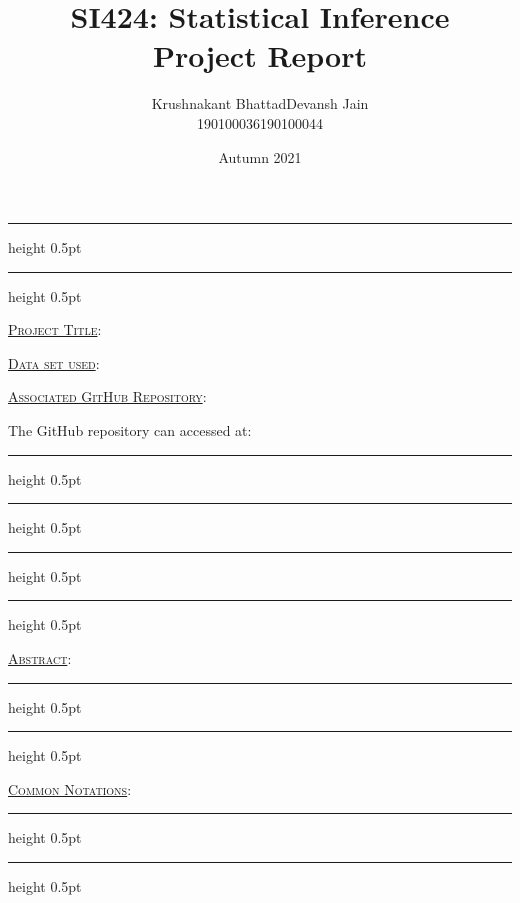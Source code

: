\documentclass[fleqn, 11pt]{article}
\title{SI424: Statistical Inference \\ Project Report}
\author{
\begin{tabular}{|c|c|}
     \hline
     \textsf{Krushnakant Bhattad} & \textsf{ \hspace{5pt} Devansh Jain \hspace{5pt} } \\
     \hline
     \textsf{190100036} & \textsf{190100044}\\
     \hline
\end{tabular}
}
\date{Autumn 2021}
\newcommand{\myline}{
  \par
  \kern3pt %
  \hrule height 0.5pt
  \kern2pt %
  \hrule height 0.5pt
  \kern3pt %
  \par
}
\renewcommand{\arraystretch}{2}%
\begin{document}
\maketitle
\thispagestyle{empty}
\renewcommand{\arraystretch}{1}%

\myline

\vspace{7pt}

\underline{\large {\textsc{Project Title}}}:

\medskip


\hrulefill

\vspace{10pt}

\underline{\large {\textsc{Data set used}}}:

\medskip


\hrulefill

\vspace{10pt}

\underline{\large {\textsc{Associated GitHub Repository}}}:

\medskip

The GitHub repository can accessed at:

\vspace{7pt}

\myline

\newpage

\setcounter{page}{1}

\vspace{-2em}
\myline

\vspace{10pt}

\underline{\large {\textsc{Abstract}}}:

\medskip


\vspace{7pt}

\myline

\vspace{10pt}

\underline{\large {\textsc{Common Notations}}}:

\medskip


\vspace{7pt}

\myline
\end{document}
